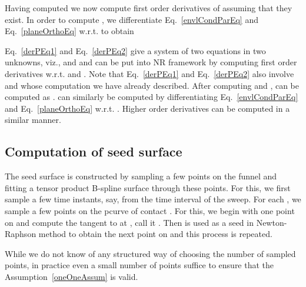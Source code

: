 \documentclass{elsart5p}
\begin{document}
Having computed  we now compute first order derivatives of  assuming that they exist.  In order to compute , we differentiate Eq.~\ref{envlCondParEq} and Eq.~\ref{planeOrthoEq} w.r.t.  to obtain

Eq.~\ref{derPEq1} and Eq.~\ref{derPEq2} give a system of two equations in two unknowns, viz.,  and 
 and can be put into NR framework by computing first order derivatives w.r.t.  
and .  Note that Eq.~\ref{derPEq1} and Eq.~\ref{derPEq2} also involve  and  whose computation we have already described.
After computing  and ,  can be computed as 
.   
can similarly be computed by differentiating Eq.~\ref{envlCondParEq} and Eq.~\ref{planeOrthoEq} w.r.t. .  Higher order derivatives can be computed in a 
similar manner.

\subsection{Computation of seed surface} \label{seedSubSec}

The seed surface is constructed by sampling a few points on the funnel and fitting a tensor 
product B-spline surface through these points.  For this, we first sample a few time instants, 
say,  from the time interval of the sweep.  For each ,  
we sample a few points on the pcurve of contact .  For this, we begin with one point  on  
and compute the tangent to  at , call it . Then  
is used as a seed in Newton-Raphson method to obtain the next point on  and this process is repeated.

While we do not know of any structured way of choosing the number of sampled points, in practice even a small 
number of points suffice to ensure that the Assumption~\ref{oneOneAssum} is valid.
\end{document}
